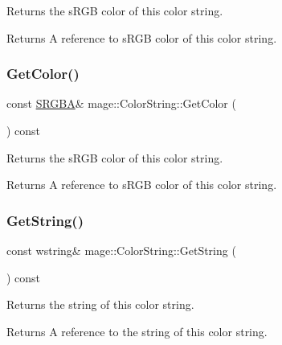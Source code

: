 Returns the s\+R\+GB color of this color string.

\begin{DoxyReturn}{Returns}
A reference to s\+R\+GB color of this color string. 
\end{DoxyReturn}
\hypertarget{classmage_1_1_color_string_a51e959bf9ba68b767fe2b61655a9c7a9}{}\label{classmage_1_1_color_string_a51e959bf9ba68b767fe2b61655a9c7a9} 
\subsubsection{\texorpdfstring{Get\+Color()}{GetColor()}\hspace{0.1cm}{\footnotesize\ttfamily [2/2]}}
{\footnotesize\ttfamily const \hyperlink{structmage_1_1_s_r_g_b_a}{S\+R\+G\+BA}\& mage\+::\+Color\+String\+::\+Get\+Color (\begin{DoxyParamCaption}{ }\end{DoxyParamCaption}) const\hspace{0.3cm}{\ttfamily [noexcept]}}

Returns the s\+R\+GB color of this color string.

\begin{DoxyReturn}{Returns}
A reference to s\+R\+GB color of this color string. 
\end{DoxyReturn}
\hypertarget{classmage_1_1_color_string_aee22268a2fe552320299dfa5ac5a93e1}{}\label{classmage_1_1_color_string_aee22268a2fe552320299dfa5ac5a93e1} 
\subsubsection{\texorpdfstring{Get\+String()}{GetString()}}
{\footnotesize\ttfamily const wstring\& mage\+::\+Color\+String\+::\+Get\+String (\begin{DoxyParamCaption}{ }\end{DoxyParamCaption}) const\hspace{0.3cm}{\ttfamily [noexcept]}}

Returns the string of this color string.

\begin{DoxyReturn}{Returns}
A reference to the string of this color string. 
\end{DoxyReturn}
\hypertarget{classmage_1_1_color_string_a568fed43403422ecafdf92d04e11c4e5}{}\label{classmage_1_1_color_string_a568fed43403422ecafdf92d04e11c4e5} 

